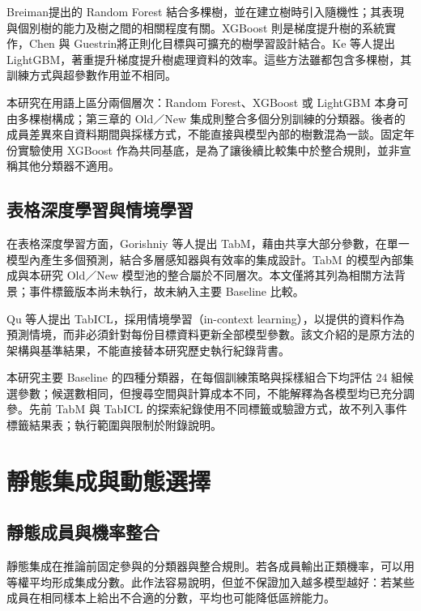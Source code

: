 Breiman\autocite{breiman2001rf}提出的 Random Forest 結合多棵樹，並在建立樹時引入隨機性；其表現與個別樹的能力及樹之間的相關程度有關。XGBoost 則是梯度提升樹的系統實作，Chen 與 Guestrin\autocite{chen2016xgboost}將正則化目標與可擴充的樹學習設計結合。Ke 等人\autocite{ke2017lightgbm}提出 LightGBM，著重提升梯度提升樹處理資料的效率。這些方法雖都包含多棵樹，其訓練方式與超參數作用並不相同。

本研究在用語上區分兩個層次：Random Forest、XGBoost 或 LightGBM 本身可由多棵樹構成；第三章的 Old／New 集成則整合多個分別訓練的分類器。後者的成員差異來自資料期間與採樣方式，不能直接與模型內部的樹數混為一談。固定年份實驗使用 XGBoost 作為共同基底，是為了讓後續比較集中於整合規則，並非宣稱其他分類器不適用。

\subsection{表格深度學習與情境學習}

在表格深度學習方面，Gorishniy 等人\autocite{gorishniy2025tabm}提出 TabM，藉由共享大部分參數，在單一模型內產生多個預測，結合多層感知器與有效率的集成設計。TabM 的模型內部集成與本研究 Old／New 模型池的整合屬於不同層次。本文僅將其列為相關方法背景；事件標籤版本尚未執行，故未納入主要 Baseline 比較。

Qu 等人\autocite{qu2025tabicl}提出 TabICL，採用情境學習（in-context learning），以提供的資料作為預測情境，而非必須針對每份目標資料更新全部模型參數。該文介紹的是原方法的架構與基準結果，不能直接替本研究歷史執行紀錄背書。

本研究主要 Baseline 的四種分類器，在每個訓練策略與採樣組合下均評估 24 組候選參數；候選數相同，但搜尋空間與計算成本不同，不能解釋為各模型均已充分調參。先前 TabM 與 TabICL 的探索紀錄使用不同標籤或驗證方式，故不列入事件標籤結果表；執行範圍與限制於附錄說明。

\section{靜態集成與動態選擇}

\subsection{靜態成員與機率整合}

靜態集成在推論前固定參與的分類器與整合規則。若各成員輸出正類機率，可以用等權平均形成集成分數。此作法容易說明，但並不保證加入越多模型越好：若某些成員在相同樣本上給出不合適的分數，平均也可能降低區辨能力。

